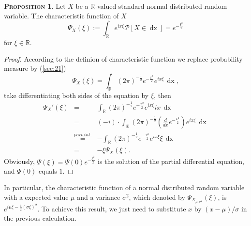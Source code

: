 \documentclass[a4paper, twoside, 11pt]{article}
\theoremstyle{definition}
\newtheorem{proposition}[definition]{\scshape Proposition}
\newcommand{\sqbr}[1]{\left[ {#1} \right]}
\begin{document}
\begin{proposition}
  Let $X$ be a $\mathbb{R}$-valued standard normal distributed random variable. The characteristic function of $X$
\begin{equation}
  \Psi_X(\xi) := \int_\mathbb{R} e^{ix\xi}\mathcal{P}\sqbr{X \in \mathop{dx}} = e^{-\frac{\xi^2}{2}}
  \label{sec:cht}
\end{equation}
for $\xi \in \mathbb{R}$.
\end{proposition}
\begin{proof}
  According to the definion of characteristic function we replace probability measure by (\ref{sec:21})
  \begin{equation*}
	\Psi_X(\xi) = \int_\mathbb{R} (2\pi)^{-\frac{1}{2}}e^{-\frac{x^2}{2}}e^{ix\xi}\,\mathop{dx},
  \end{equation*}
take differentiating both sides of the equation by $\xi$, then
\begin{eqnarray*}
\Psi_X'(\xi) &=& \int_\mathbb{R}(2\pi)^{-\frac{1}{2}}e^{-\frac{x^2}{2}}e^{ix\xi}ix\,\mathop{dx}\\
             &=& (-i)\cdot\int_\mathbb{R} (2\pi)^{-\frac{1}{2}}(\frac{d}{dx}e^{-\frac{x^2}{2}})e^{ix\xi}\,\mathop{dx}\\
			 &\overset{part.int.}{=}& -\int_\mathbb{R}(2\pi)^{-\frac{1}{2}}e^{-\frac{x^2}{2}}e^{ix\xi}\xi\,\mathop{dx}\\
			 &=& -\xi\Psi_X(\xi).
\end{eqnarray*}
Obviously, 
$\Psi(\xi) = \Psi(0)e^{-\frac{\xi^2}{2}}$ is the solution of the partial differential equation, and $\Psi(0)$ equals $1$.
\end{proof}

In particular, the characteristic function of a normal distributed random variable with a expected value $\mu$ and a variance $\sigma^2$, which denoted by $\Psi_{X_{\mu,\sigma^2}}(\xi)$, is $e^{i\mu\xi-\frac{1}{2}(\sigma\xi)^2}$. To achieve this result, we just need to substitute $x$ by $(x-\mu)/\sigma$ in the previous calculation. 
\end{document}
